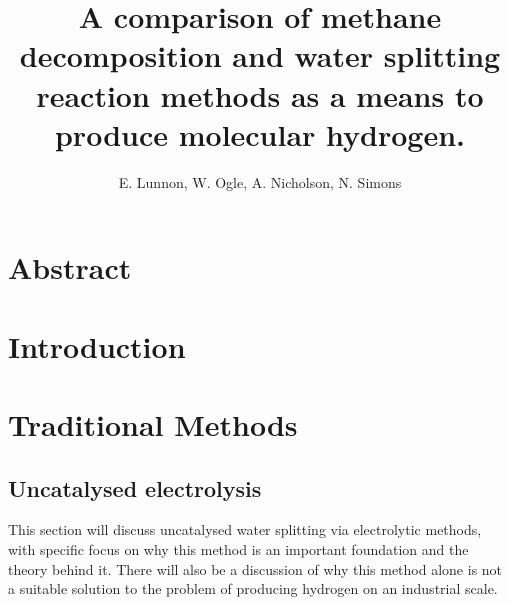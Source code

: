 \documentclass[a4paper]{article}
\title{A comparison of methane decomposition and water splitting reaction methods as a means to produce molecular hydrogen.}
\author{E. Lunnon, W. Ogle, A. Nicholson, N. Simons}
\begin{document}
\maketitle
\tableofcontents
\newpage


\section*{Abstract}%
\label{sec:abstract}

\cite{lei2019}
\cite{6278114}
\cite{merrill2006}

\clearpage


\section{Introduction}%
\label{sec:introduction}



\clearpage

\section{Traditional Methods}%
\label{sub:Traditional_Methods}





\subsection{Uncatalysed electrolysis}%
\label{sub:Uncatalysed_electrolysis}

This section will discuss uncatalysed water splitting via electrolytic methods, with specific focus on why this method is an important foundation and the theory behind it.
There will also be a discussion of why this method alone is not a suitable solution to the problem of producing hydrogen on an industrial scale.
\end{document}
